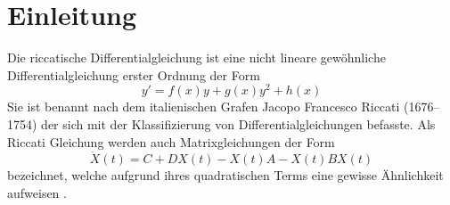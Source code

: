 \section{Einleitung} \label{kra:section:einleitung}
Die riccatische Differentialgleichung ist eine nicht lineare gewöhnliche Differentialgleichung erster Ordnung der Form
\begin{equation}
    \label{kra:equation:riccati}
    y' = f(x)y + g(x)y^2 + h(x)
\end{equation}
Sie ist benannt nach dem italienischen Grafen Jacopo Francesco Riccati (1676–1754) der sich mit der Klassifizierung von Differentialgleichungen befasste.
Als Riccati Gleichung werden auch Matrixgleichungen der Form
\begin{equation}
    \label{kra:equation:matrixriccati}
    \dot{X}(t) = C + DX(t) - X(t)A -X(t)BX(t)
\end{equation}
bezeichnet, welche aufgrund ihres quadratischen Terms eine gewisse Ähnlichkeit aufweisen \cite{kra:ethz} \cite{kra:riccati}.
